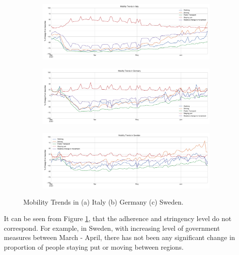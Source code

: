 \documentclass[preprint,authoryear,12pt]{elsarticle}
\begin{document}
    	\begin{figure}
    		\centering
    	\begin{subfigure}[b]{\textwidth}
    		\centering
    		\includegraphics[width=0.9\linewidth,height=0.2\textheight]{Mobility Trends in Italy}
    	\end{subfigure}
    	
    	\begin{subfigure}[b]{\textwidth}
    		\centering
    		\includegraphics[width=0.9\linewidth,height=0.2\textheight]{Mobility Trends in Germany}
    	\end{subfigure}
    	
    	\begin{subfigure}[b]{\textwidth}
    		\centering
    		\includegraphics[width=0.9\linewidth,height=0.2\textheight]{Mobility Trends in Sweden}
    	\end{subfigure}
    	
    	\caption[Mobility Trends]{Mobility Trends in (a) Italy (b) Germany (c) Sweden.}
    	\label{fig3} 
    \end{figure}
    
    It can be seen from Figure \ref{fig3}, that the adherence  and stringency level do not correspond. For example, in Sweden, with increasing level of government measures between March - April, there has not been any significant change in proportion of people staying put or moving between regions.
    
\end{document}
